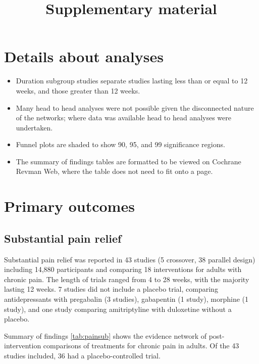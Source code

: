 \documentclass{report}\usepackage[]{graphicx}\usepackage[]{color}
\title{Supplementary material}
\begin{document}
\maketitle

\tableofcontents

\listoftables

\listoffigures


\chapter{Details about analyses}

\begin{itemize}

\item Duration subgroup studies separate studies lasting less than or equal to 12 weeks, and those greater than 12 weeks.
\item Many head to head analyses were not possible given the disconnected nature of the networks; where data was available head to head analyses were undertaken.
\item Funnel plots are shaded to show 90, 95, and 99 significance regions.
\item The summary of findings tables are formatted to be viewed on Cochrane Revman Web, where the table does not need to fit onto a page.

\end{itemize}


\chapter{Primary outcomes}

\section{Substantial pain relief}

Substantial pain relief was reported in 43 studies (5 crossover,  38 parallel design) including 14,880 participants and comparing 18 interventions for adults with chronic pain.  The length of trials ranged from 4 to 28 weeks, with the majority lasting 12 weeks. 7 studies did not include a placebo trial, comparing antidepressants with pregabalin (3 studies), gabapentin (1 study), morphine (1 study), and one study comparing amitriptyline with duloxetine without a placebo.

Summary of findings \ref{tab:painsub} shows the evidence network of post-intervention comparisons of treatments for chronic pain in adults. Of the 43 studies included, 36 had a placebo-controlled trial.
\end{document}
